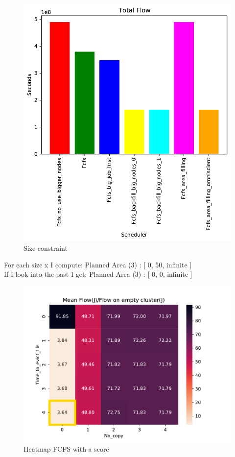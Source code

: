 \documentclass[a4paper]{article}
\begin{document}
\begin{figure}[H]\centering\includegraphics[width=1\linewidth]{MBSS/plot/Size_Constraint_2022-02-08->2022-02-08_very_reduced_Total_flow_95_128_4_256_1_1024.pdf}\caption{Size constraint}\end{figure}
For each size x I compute: Planned Area (3) : [ 0, 50, infinite ] \\
If I look into the past I get: Planned Area (3) : [ 0, 0, infinite ]
\begin{figure}[H]\centering\includegraphics[width=1\linewidth]{MBSS/plot/FCFS_Score_Expe_V2/Heatmap_FCFS_Score_Time_to_evict_file_Nb_copy_2022-02-08->2022-02-08_very_reduced_95_128_4_256_1_1024.pdf}\caption{Heatmap FCFS with a score}\end{figure}
\end{document}
